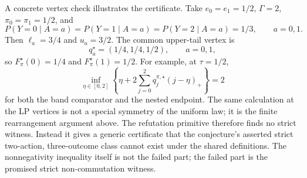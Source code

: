 A concrete vertex check illustrates the certificate.  Take \(e_0=e_1=1/2\), \(\Gamma=2\),
\(\pi_0=\pi_1=1/2\), and
\[
P(Y=0\mid A=a)=P(Y=1\mid A=a)=P(Y=2\mid A=a)=1/3,\qquad a=0,1.
\]
Then \(\ell_a=3/4\) and \(u_a=3/2\).  The common upper-tail vertex is
\[
q_a^\star=(1/4,1/4,1/2),\qquad a=0,1,
\]
so \(F^\star_\pi(0)=1/4\) and \(F^\star_\pi(1)=1/2\).  For example, at
\(\tau=1/2\),
\[
\inf_{\eta\in[0,2]}
\left\{\eta+2\sum_{j=0}^2q^{\pi,\star}_j(j-\eta)_+\right\}
=2
\]
for both the band comparator and the nested endpoint.  The same calculation at the LP vertices is
not a special symmetry of the uniform law; it is the finite rearrangement argument above.  The
refutation primitive therefore finds no strict witness.  Instead it gives a generic certificate
that the conjecture's asserted strict two-action, three-outcome class cannot exist under the
shared definitions.  The nonnegativity inequality itself is not the failed part; the failed part
is the promised strict non-commutation witness.
